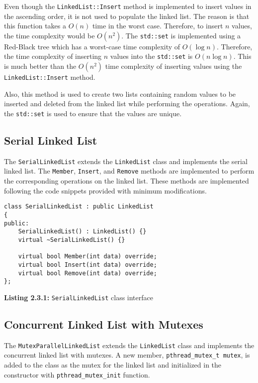 \documentclass[a4paper,12pt]{article}
\begin{document}
Even though the \lstinline|LinkedList::Insert| method is implemented to insert values in the ascending order, it is not used to populate the linked list. The reason is that this function takes a \( O(n) \) time in the worst case. Therefore, to insert \( n \) values, the time complexity would be \( O(n^2) \). The \lstinline|std::set| is implemented using a Red-Black tree which has a worst-case time complexity of \( O(\log n) \). Therefore, the time complexity of inserting \( n \) values into the \lstinline|std::set| is \( O(n \log n) \). This is much better than the \( O(n^2) \) time complexity of inserting values using the \lstinline|LinkedList::Insert| method.

Also, this method is used to create two lists containing random values to be inserted and deleted from the linked list while performing the operations. Again, the \lstinline|std::set| is used to ensure that the values are unique.

\subsection{Serial Linked List}

The \lstinline|SerialLinkedList| extends the \lstinline|LinkedList| class and implements the serial linked list. The \lstinline|Member|, \lstinline|Insert|, and \lstinline|Remove| methods are implemented to perform the corresponding operations on the linked list. These methods are implemented following the code snippets provided with minimum modifications.

\begin{lstlisting}
class SerialLinkedList : public LinkedList
{
public:
    SerialLinkedList() : LinkedList() {}
    virtual ~SerialLinkedList() {}

    virtual bool Member(int data) override;
    virtual bool Insert(int data) override;
    virtual bool Remove(int data) override;
};
\end{lstlisting}
\begin{center}
    \textbf{Listing 2.3.1:} \lstinline|SerialLinkedList| class interface
\end{center}

\subsection{Concurrent Linked List with Mutexes}

The \lstinline|MutexParallelLinkedList| extends the \lstinline|LinkedList| class and implements the concurrent linked list with mutexes. A new member, \lstinline|pthread_mutex_t mutex|, is added to the class as the mutex for the linked list and initialized in the constructor with \lstinline|pthread_mutex_init| function.
\end{document}
